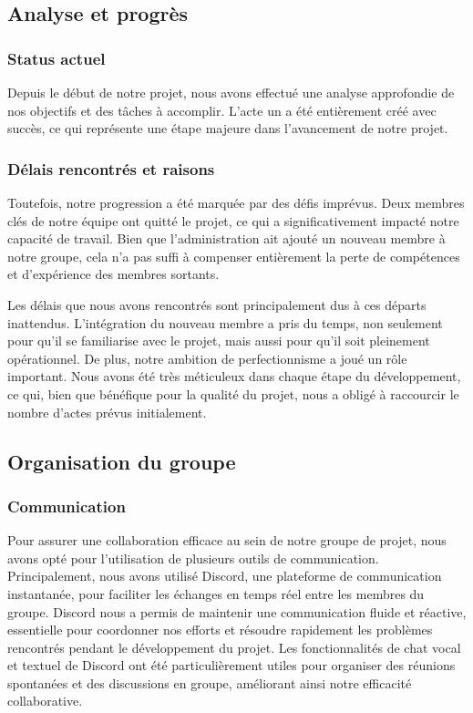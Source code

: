 \subsection{Analyse et progrès}

\subsubsection{Status actuel}

Depuis le début de notre projet, nous avons effectué une analyse approfondie de nos objectifs et des tâches à accomplir. L'acte un a été entièrement créé avec succès, ce qui représente une étape majeure dans l'avancement de notre projet.  

\subsubsection{Délais rencontrés et raisons}

Toutefois, notre progression a été marquée par des défis imprévus. Deux membres clés de notre équipe ont quitté le projet, ce qui a significativement impacté notre capacité de travail. Bien que l'administration ait ajouté un nouveau membre à notre groupe, cela n'a pas suffi à compenser entièrement la perte de compétences et d'expérience des membres sortants. 

Les délais que nous avons rencontrés sont principalement dus à ces départs inattendus. L'intégration du nouveau membre a pris du temps, non seulement pour qu'il se familiarise avec le projet, mais aussi pour qu'il soit pleinement opérationnel. De plus, notre ambition de perfectionnisme a joué un rôle important. Nous avons été très méticuleux dans chaque étape du développement, ce qui, bien que bénéfique pour la qualité du projet, nous a obligé à raccourcir le nombre d’actes prévus initialement. 
\subsection{Organisation du groupe}

\subsubsection{Communication}

Pour assurer une collaboration efficace au sein de notre groupe de projet, nous avons opté pour l'utilisation de plusieurs outils de communication. Principalement, nous avons utilisé Discord, une plateforme de communication instantanée, pour faciliter les échanges en temps réel entre les membres du groupe. Discord nous a permis de maintenir une communication fluide et réactive, essentielle pour coordonner nos efforts et résoudre rapidement les problèmes rencontrés pendant le développement du projet. Les fonctionnalités de chat vocal et textuel de Discord ont été particulièrement utiles pour organiser des réunions spontanées et des discussions en groupe, améliorant ainsi notre efficacité collaborative. 
\\

